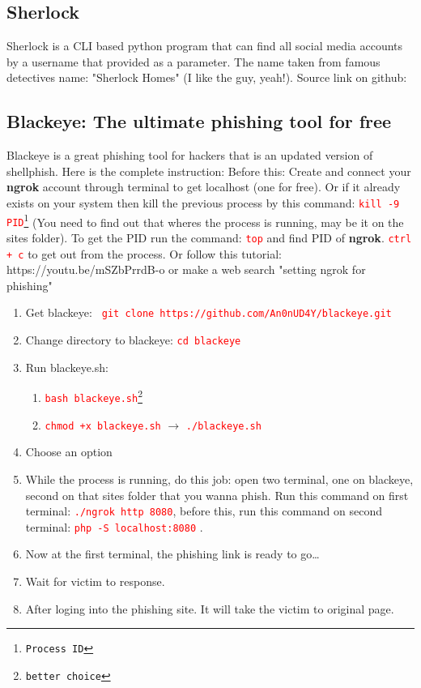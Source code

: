\documentclass[12 pt, letterpaper]{extarticle}
\newcommand{\R}{\textcolor{red}} %
\newcommand{\T}{\texttt}
\begin{document}
\subsection*{Sherlock}
Sherlock is a CLI based python program that can find all social media accounts by a username that provided as a parameter. The name taken from famous detectives name: "Sherlock Homes" (I like the guy, yeah!). Source link on github: %

\subsection*{Blackeye: The ultimate phishing tool for free} %
Blackeye is a great phishing tool for hackers that is an updated version of shellphish. Here is the complete instruction:
Before this: Create and connect your \textbf{ngrok} account through terminal to get localhost (one for free). Or if it already exists on your system then kill the previous process by this command: \R{\T{kill -9 {PID\footnote{Process ID}}}} (You need to find out that wheres the process is running, may be it on the sites folder). To get the PID run the command: \R{\T{top}} and find PID of \textbf{ngrok}. \R{\T{ctrl + c}} to get out from the process. Or follow this tutorial: {https://youtu.be/mSZbPrrdB-o} or make a web search "setting ngrok for phishing"
\begin{enumerate}
	\item Get blackeye:  \R{\T{ git clone https://github.com/An0nUD4Y/blackeye.git}}
	\item Change directory to blackeye: \R{\T{cd blackeye}}
	\item Run blackeye.sh:
		\begin{enumerate}
			\item \R{\T{bash blackeye.sh\footnote{better choice}}}
			\item \R{\T{chmod +x blackeye.sh}} $\rightarrow$ \R{\T{./blackeye.sh}}
		\end{enumerate}
	\item Choose an option
	\item While the process is running, do this job: open two terminal, one on blackeye, second on that sites folder that you wanna phish. Run this command on first terminal: \R{\T{./ngrok http 8080}}, before this, run this command on second terminal: \R{\T{php -S localhost:8080}} .
	\item Now at the first terminal, the phishing link is ready to go\dots
	\item Wait for victim to response.
	\item After loging into the phishing site. It will take the victim to original page.
\end{enumerate}
\end{document}
